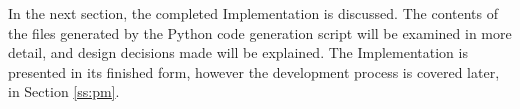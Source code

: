\vspace{4em}
\noindent In the next section, the completed Implementation is discussed. The contents of the files generated by the Python code generation script will be examined in more detail, and design decisions made will be explained. The Implementation is presented in its finished form, however the development process is covered later, in Section \ref{ss:pm}.
